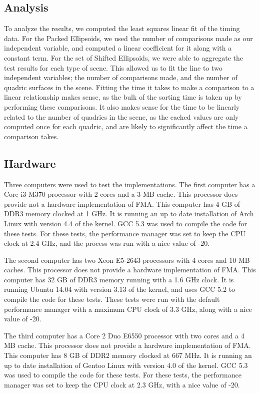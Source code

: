 \documentclass{cccg16}
\begin{document}
\subsection{Analysis}
To analyze the results, we computed the least squares linear fit of
the timing data.  For the Packed Ellipsoids, we used the number of
comparisons made as our independent variable, and computed a linear
coefficient for it along with a constant term.  For the set of Shifted
Ellipsoids, we were able to aggregate the test results for each type
of scene.  This allowed us to fit the line to two independent
variables; the number of comparisons made, and the number of quadric
surfaces in the scene.  Fitting the time it takes to make a comparison
to a linear relationship makes sense, as the bulk of the sorting time
is taken up by performing these comparisons.  It also makes sense for
the time to be linearly related to the number of quadrics in the
scene, as the cached values are only computed once for each quadric,
and are likely to significantly affect the time a comparison takes.

\subsection{Hardware}
Three computers were used to test the implementations.  The first
computer has a Core i3 M370 processor with 2 cores and a 3 MB cache.
This processor does provide not a hardware implementation of FMA.
This computer has 4 GB of DDR3 memory clocked at 1 GHz.  It is running
an up to date installation of Arch Linux with version 4.4 of the
kernel.  GCC 5.3 was used to compile the code for these tests.  For
these tests, the performance manager was set to keep the CPU clock at
2.4 GHz, and the process was run with a nice value of -20.

The second computer has two Xeon E5-2643 processors with 4 cores and
10 MB caches.  This processor does not provide a hardware
implementation of FMA.  This computer has 32 GB of DDR3 memory running
with a 1.6 GHz clock.  It is running Ubuntu 14.04 with version 3.13 of
the kernel, and uses GCC 5.2 to compile the code for these tests.
These tests were run with the default performance manager with a
maximum CPU clock of 3.3 GHz, along with a nice value of -20.

The third computer has a Core 2 Duo E6550 processor with two cores and
a 4 MB cache.  This processor does not provide a hardware
implementation of FMA.  This computer has 8 GB of DDR2 memory clocked
at 667 MHz.  It is running an up to date installation of Gentoo Linux
with version 4.0 of the kernel.  GCC 5.3 was used to compile the code
for these tests.  For these tests, the performance manager was set to
keep the CPU clock at 2.3 GHz, with a nice value of -20.
\end{document}
